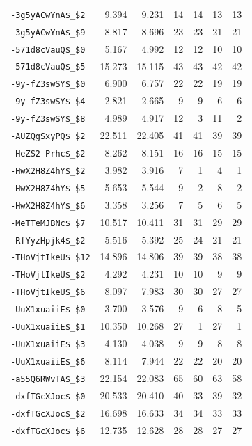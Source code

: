 \begin{longtable}{@{}lrrrrrr@{}}
\nolinkurl{-3g5yACwYnA$_$2} & 9.394 & 9.231 & 14 & 14 & 13 & 13\\
\nolinkurl{-3g5yACwYnA$_$9} & 8.817 & 8.696 & 23 & 23 & 21 & 21\\
\nolinkurl{-571d8cVauQ$_$0} & 5.167 & 4.992 & 12 & 12 & 10 & 10\\
\nolinkurl{-571d8cVauQ$_$5} & 15.273 & 15.115 & 43 & 43 & 42 & 42\\
\nolinkurl{-9y-fZ3swSY$_$0} & 6.900 & 6.757 & 22 & 22 & 19 & 19\\
\nolinkurl{-9y-fZ3swSY$_$4} & 2.821 & 2.665 & 9 & 9 & 6 & 6\\
\nolinkurl{-9y-fZ3swSY$_$8} & 4.989 & 4.917 & 12 & 3 & 11 & 2\\
\nolinkurl{-AUZQgSxyPQ$_$2} & 22.511 & 22.405 & 41 & 41 & 39 & 39\\
\nolinkurl{-HeZS2-Prhc$_$2} & 8.262 & 8.151 & 16 & 16 & 15 & 15\\
\nolinkurl{-HwX2H8Z4hY$_$2} & 3.982 & 3.916 & 7 & 1 & 4 & 1\\
\nolinkurl{-HwX2H8Z4hY$_$5} & 5.653 & 5.544 & 9 & 2 & 8 & 2\\
\nolinkurl{-HwX2H8Z4hY$_$6} & 3.358 & 3.256 & 7 & 5 & 6 & 5\\
\nolinkurl{-MeTTeMJBNc$_$7} & 10.517 & 10.411 & 31 & 31 & 29 & 29\\
\nolinkurl{-RfYyzHpjk4$_$2} & 5.516 & 5.392 & 25 & 24 & 21 & 21\\
\nolinkurl{-THoVjtIkeU$_$12} & 14.896 & 14.806 & 39 & 39 & 38 & 38\\
\nolinkurl{-THoVjtIkeU$_$2} & 4.292 & 4.231 & 10 & 10 & 9 & 9\\
\nolinkurl{-THoVjtIkeU$_$6} & 8.097 & 7.983 & 30 & 30 & 27 & 27\\
\nolinkurl{-UuX1xuaiiE$_$0} & 3.700 & 3.576 & 9 & 6 & 8 & 5\\
\nolinkurl{-UuX1xuaiiE$_$1} & 10.350 & 10.268 & 27 & 1 & 27 & 1\\
\nolinkurl{-UuX1xuaiiE$_$3} & 4.130 & 4.038 & 9 & 9 & 8 & 8\\
\nolinkurl{-UuX1xuaiiE$_$6} & 8.114 & 7.944 & 22 & 22 & 20 & 20\\
\nolinkurl{-a55Q6RWvTA$_$3} & 22.154 & 22.083 & 65 & 60 & 63 & 58\\
\nolinkurl{-dxfTGcXJoc$_$0} & 20.533 & 20.410 & 40 & 33 & 39 & 32\\
\nolinkurl{-dxfTGcXJoc$_$2} & 16.698 & 16.633 & 34 & 34 & 33 & 33\\
\nolinkurl{-dxfTGcXJoc$_$6} & 12.735 & 12.628 & 28 & 28 & 27 & 27\\

\end{longtable}
